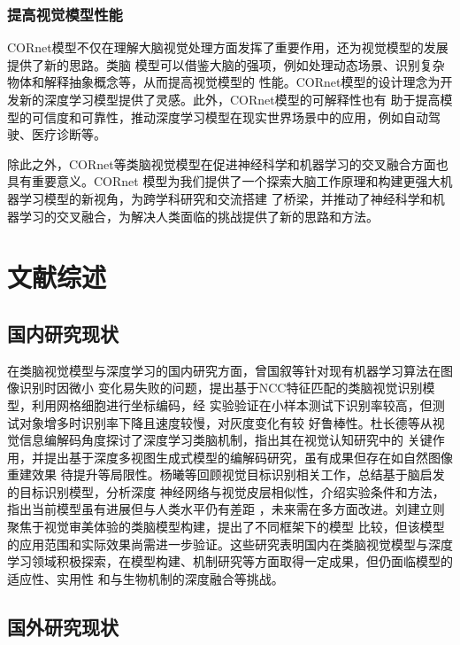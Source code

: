 \subsubsection{提高视觉模型性能}

CORnet模型不仅在理解大脑视觉处理方面发挥了重要作用，还为视觉模型的发展提供了新的思路。类脑
模型可以借鉴大脑的强项，例如处理动态场景、识别复杂物体和解释抽象概念等，从而提高视觉模型的
性能。CORnet模型的设计理念为开发新的深度学习模型提供了灵感。此外，CORnet模型的可解释性也有
助于提高模型的可信度和可靠性，推动深度学习模型在现实世界场景中的应用，例如自动驾驶、医疗诊断等。

除此之外，CORnet等类脑视觉模型在促进神经科学和机器学习的交叉融合方面也具有重要意义。CORnet
模型为我们提供了一个探索大脑工作原理和构建更强大机器学习模型的新视角，为跨学科研究和交流搭建
了桥梁，并推动了神经科学和机器学习的交叉融合，为解决人类面临的挑战提供了新的思路和方法。



\section{文献综述}

\subsection{国内研究现状}

在类脑视觉模型与深度学习的国内研究方面，曾国叙等针对现有机器学习算法在图像识别时因微小
变化易失败的问题，提出基于NCC特征匹配的类脑视觉识别模型，利用网格细胞进行坐标编码，经
实验验证在小样本测试下识别率较高，但测试对象增多时识别率下降且速度较慢，对灰度变化有较
好鲁棒性。杜长德等从视觉信息编解码角度探讨了深度学习类脑机制，指出其在视觉认知研究中的
关键作用，并提出基于深度多视图生成式模型的编解码研究，虽有成果但存在如自然图像重建效果
待提升等局限性。杨曦等回顾视觉目标识别相关工作，总结基于脑启发的目标识别模型，分析深度
神经网络与视觉皮层相似性，介绍实验条件和方法，指出当前模型虽有进展但与人类水平仍有差距
，未来需在多方面改进。刘建立则聚焦于视觉审美体验的类脑模型构建，提出了不同框架下的模型
比较，但该模型的应用范围和实际效果尚需进一步验证。这些研究表明国内在类脑视觉模型与深度
学习领域积极探索，在模型构建、机制研究等方面取得一定成果，但仍面临模型的适应性、实用性
和与生物机制的深度融合等挑战。

\subsection{国外研究现状}

